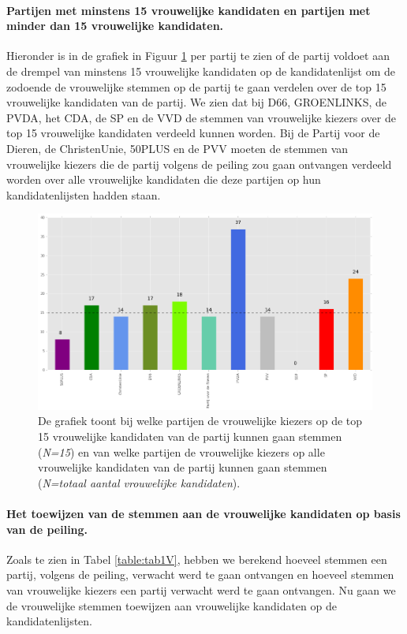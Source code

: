 \paragraph{Partijen met minstens 15 vrouwelijke kandidaten en partijen met minder dan 15 vrouwelijke kandidaten.}
Hieronder is in de grafiek in Figuur \ref{fig:15V} per partij te zien of de partij voldoet aan de drempel van minstens 15 vrouwelijke kandidaten op de kandidatenlijst om de zodoende de vrouwelijke stemmen op de partij te gaan verdelen over de top 15 vrouwelijke kandidaten van de partij. We zien dat bij D66, GROENLINKS, de PVDA, het CDA, de SP en de VVD de stemmen van vrouwelijke kiezers over de top 15 vrouwelijke kandidaten verdeeld kunnen worden. Bij de Partij voor de Dieren, de ChristenUnie, 50PLUS en de PVV moeten de stemmen van vrouwelijke kiezers die de partij volgens de peiling zou gaan ontvangen verdeeld worden over alle vrouwelijke kandidaten die deze partijen op hun kandidatenlijsten hadden staan.

\begin{figure}[H]

	\includegraphics[width=\linewidth]	{top15_of_topN_kandidaten.png}

			\caption{De grafiek toont bij welke partijen de vrouwelijke kiezers op de top 15 vrouwelijke kandidaten van de partij kunnen gaan stemmen (\textit{N=15}) en van welke partijen de vrouwelijke kiezers op alle vrouwelijke kandidaten van de partij kunnen gaan stemmen (\textit{N=totaal aantal vrouwelijke kandidaten}).}  

\label{fig:15V}
\end{figure}

\paragraph{Het toewijzen van de stemmen aan de vrouwelijke kandidaten op basis van de peiling.}
Zoals te zien in Tabel \ref{table:tab1V}, hebben we berekend hoeveel stemmen een partij, volgens de peiling, verwacht werd te gaan ontvangen en hoeveel stemmen van vrouwelijke kiezers een partij verwacht werd te gaan ontvangen. Nu gaan we de vrouwelijke stemmen toewijzen aan vrouwelijke kandidaten op de kandidatenlijsten. 

